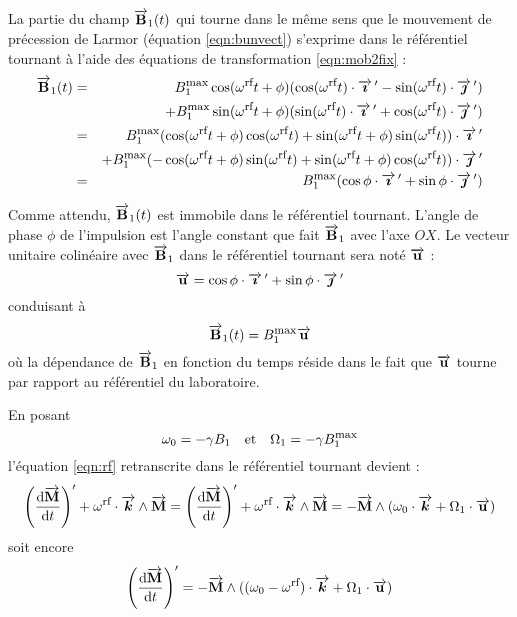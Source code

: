 La partie du champ $\bunvect$ qui tourne dans le même sens
que le mouvement de précession de Larmor
(équation \ref{eqn:bunvect}) s'exprime dans le référentiel tournant
à l'aide des équations de transformation \ref{eqn:mob2fix} :
\begin{eqnarray}
\bunvect & = & \bunmax\cos(\omrft+\phi)(\cos(\omrft)\cdot\iprimvec-\sin(\omrft)\cdot\jprimvec)
\nonumber\\
& & + \bunmax\sin(\omrft+\phi)(\sin(\omrft)\cdot\iprimvec+\cos(\omrft)\cdot\jprimvec) \\
& = & \bunmax(\cos(\omrft+\phi)\cos(\omrft) + \sin(\omrft+\phi)\sin(\omrft))\cdot\iprimvec
\nonumber\\
& & + \bunmax(-\cos(\omrft+\phi)\sin(\omrft) + \sin(\omrft+\phi)\cos(\omrft))\cdot\jprimvec
\nonumber\\
& = & \bunmax(\cos\phi\cdot\iprimvec+\sin\phi\cdot\jprimvec)
\end{eqnarray}

Comme attendu, $\bunvect$ est immobile dans le référentiel tournant.
L'angle de phase $\phi$ de l'impulsion est l'angle constant que fait $\bunvec$ avec l'axe $OX$.
Le vecteur unitaire colinéaire avec $\bunvec$ dans le référentiel tournant sera noté 
$\uvec$ :
\begin{equation}
\uvec = \cos\phi \cdot \iprimvec + \sin\phi \cdot \jprimvec
\end{equation}
conduisant à
\begin{equation}
\bunvect = \bunmax\uvec
\end{equation}
où la dépendance de $\bunvec$ en fonction du temps réside dans le fait
que $\uvec$ tourne par rapport au référentiel du laboratoire.

En posant
\begin{equation}
\omega_0 = -\gamma\buns \qetq \omuns = -\gamma\bunmax
\end{equation}
l'équation \ref{eqn:rf} retranscrite dans le référentiel tournant devient :
\begin{equation}
\left(\derivt{\aimvec}\right)' + \omrf\cdot\kvec\wedge\aimvec = 
\left(\frac{\mbox{d}\aimvec}{\mbox{d}t}\right)' + \omrf\cdot\kvec\wedge\aimvec = 
- \aimvec\wedge (\omega_0\cdot\kvec + \omuns\cdot\uvec)
\end{equation}
soit encore 
\begin{equation}
\left(\derivt{\aimvec}\right)' =
-\aimvec\wedge((\omega_0-\omrf)\cdot\kvec + \omuns\cdot\uvec)
\end{equation}


